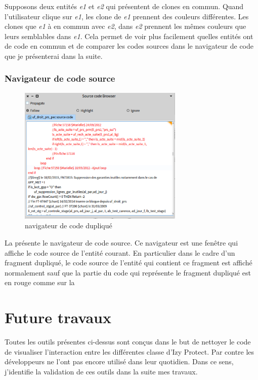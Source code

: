 \documentclass[a4paper]{article}
\begin{document}
Supposons deux entités \textit{e1} et \textit{e2} qui présentent de clones en commun.
Quand l'utilisateur clique sur \textit{e1}, les clone de \textit{e1} prennent des couleurs différentes.
Les clones que \textit{e1} à en commun avec \textit{e2}, dans \textit{e2} prennent les mêmes couleurs que leurs semblables dans \textit{e1}.
Cela permet de voir plus facilement quelles entités ont de code en commun et de comparer les codes sources dans le navigateur de code que je présenterai dans la suite. 

\subsubsection{Navigateur de code source}
\begin{figure}[htbp]
  \begin{center}
  \includegraphics[width=0.7\textwidth]{./figures/sourceCodeBrowser.png}
  \caption{navigateur de code dupliqué}
  \label{fig:sourceCodeBrowser}
\end{center}
\vspace{-0.3cm}
\end{figure}
La  présente le navigateur de code source. 
Ce navigateur est une fenêtre qui affiche le code source de l'entité courant.
En particulier dans le cadre d'un fragment dupliqué, le code source de l'entité qui contient ce fragment est affiché normalement sauf que la partie du code qui représente le fragment dupliqué est en rouge comme sur la 

\section{Future travaux}
\label{sec:roadmap}
Toutes les outils présentes ci-dessus sont conçus dans le but de nettoyer le code de visualiser l'interaction entre les différentes classe d'Izy Protect.
Par contre les développeurs ne l'ont pas encore utilisé dans leur quotidien.
Dans ce sens, j'identifie la validation de ces outils dans la suite mes travaux.
\end{document}
